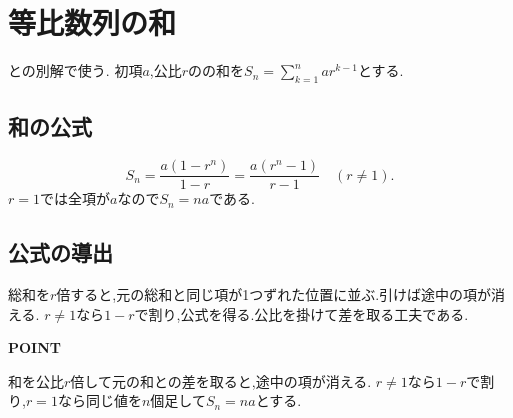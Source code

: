 
\section{等比数列の和}\label{節：等比数列の和}
との別解で使う.
初項$a$,公比$r$のの和を$S_n=\sum_{k=1}^n ar^{k-1}$とする.

\subsection{和の公式}\label{節：等比数列の和：和の公式}
\[
  S_n=\frac{a(1-r^n)}{1-r}=\frac{a(r^n-1)}{r-1}
  \quad(r\ne1).
\]
$r=1$では全項が$a$なので$S_n=na$である.

\subsection{公式の導出}\label{節：等比数列の和：公式の導出}
総和を$r$倍すると,元の総和と同じ項が1つずれた位置に並ぶ.引けば途中の項が消える.
\BookMathLayout{\[
    \begin{array}{rrrl}
      &S_n={}&a+&\hspace{-0.75em}ar+ar^2+\cdots+ar^{n-1}\\
      -\,) &rS_n={}&{}&\hspace{-0.75em}ar+ar^2+ar^3+\cdots+ar^n\\ \hline
      &(1-r)S_n={}&{}&\hspace{-0.75em}a-ar^n
    \end{array}
  \]}{
  \[
    \begin{array}{rl}
      S_n={}&a+ar+ar^2+\cdots\\
      &{}+ar^{n-1}\\
      -\,)\ rS_n={}&ar+ar^2+ar^3+\cdots\\
      &{}+ar^n\\ \hline
      (1-r)S_n={}&a-ar^n
    \end{array}
  \]
}
$r\ne1$なら$1-r$で割り,公式を得る.公比を掛けて差を取る工夫である.

\begin{bookpoint}
  \textbf{POINT}\par
  和を公比$r$倍して元の和との差を取ると,途中の項が消える.
  $r\ne1$なら$1-r$で割り,$r=1$なら同じ値を$n$個足して$S_n=na$とする.
\end{bookpoint}
